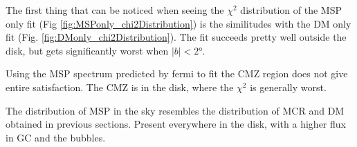 The first thing that can be noticed when seeing the $\chi^2$ distribution of the MSP only fit (Fig \ref{fig:MSPonly_chi2Distribution}) is the similitudes with the DM only fit (Fig. \ref{fig:DMonly_chi2Distribution}). The fit succeeds pretty well outside the disk, but gets significantly worst when $|b| < 2°$.
%


Using the MSP spectrum predicted by fermi   to fit the CMZ region does not give entire satisfaction. The CMZ is in the disk, where the $\chi^2$ is generally worst.


%

The distribution of MSP in the sky resembles the distribution of MCR and DM obtained in previous sections. Present everywhere in the disk, with a higher flux in GC and the bubbles.







